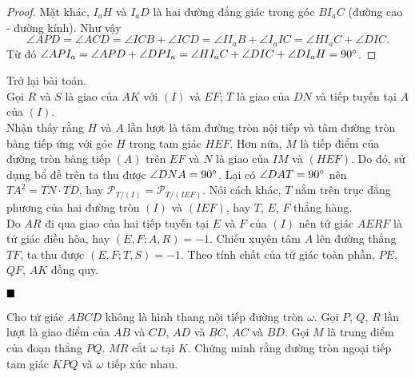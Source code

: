 \documentclass{article} %
\newenvironment{solution}[1][Lời giải]{%
  \proof[\faPenNib \hspace{0.2cm} \ttfamily \scshape \large #1]%
}{\(\hfill \blacksquare\){\parfillskip0pt\par}}
\begin{document}
\begin{solution}
\begin{enumerate}
\begin{proof}
                    Mặt khác, \(I_aH\) và \(I_aD\) là hai đường đẳng giác trong góc \(BI_aC\) (đường cao - đường kính). Như vậy
                    \[\angle APD = \angle ACD = \angle ICB + \angle ICD = \angle II_aB + \angle I_aIC = \angle HI_aC + \angle DIC.\]
                    Từ đó \(\angle API_a = \angle APD + \angle DPI_a = \angle HI_aC + \angle DIC + \angle DI_aH = 90 \degree\).
                \end{proof}
                Trở lại bài toán.\\
                Gọi \(R\) và \(S\) là giao của \(AK\) với \((I)\) và \(EF\); \(T\) là giao của \(DN\) và tiếp tuyến tại \(A\) của \((I)\).\\
                Nhận thấy rằng \(H\) và \(A\) lần lượt là tâm đường tròn nội tiếp và tâm đường tròn bàng tiếp ứng với góc \(H\) trong tam giác \(HEF\). Hơn nữa, \(M\) là tiếp điểm của đường tròn bàng tiếp \((A)\) trên \(EF\) và \(N\) là giao của \(IM\) và \((HEF)\). Do đó, sử dụng bổ đề trên ta thu được \(\angle DNA = 90 \degree\). Lại có \(\angle DAT = 90 \degree\) nên \(TA^2 = \overline{TN} \cdot \overline{TD}\), hay \(\mathcal{P}_{T/(I)} = \mathcal{P}_{T/(IEF)}\). Nói cách khác, \(T\) nằm trên trục đẳng phương của hai đường tròn \((I)\) và \((IEF)\), hay \(T\), \(E\), \(F\) thẳng hàng.\\
                Do \(AR\) đi qua giao của hai tiếp tuyến tại \(E\) và \(F\) của \((I)\) nên tứ giác \(AERF\) là tứ giác điều hòa, hay \((E,F;A,R) = -1\). Chiếu xuyên tâm \(A\) lên đường thẳng \(TF\), ta thu được \((E,F;T,S) = -1\). Theo tính chất của tứ giác toàn phần, \(PE\), \(QF\), \(AK\) đồng quy.
            \end{enumerate}
        \end{solution}

        \begin{problem}
            Cho tứ giác \(ABCD\) không là hình thang nội tiếp đường tròn \(\omega\). Gọi \(P\), \(Q\), \(R\) lần lượt là giao điểm của \(AB\) và \(CD\), \(AD\) và \(BC\), \(AC\) và \(BD\). Gọi \(M\) là trung điểm của đoạn thẳng \(PQ\). \(MR\) cắt \(\omega\) tại \(K\). Chứng minh rằng đường tròn ngoại tiếp tam giác \(KPQ\) và \(\omega\) tiếp xúc nhau.
        \end{problem}
\end{document}
